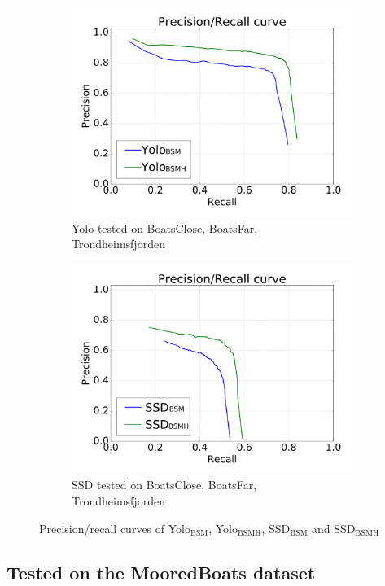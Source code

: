 \begin{figure}[h!]
\begin{subfigure}{.5\textwidth}
  \centering
  \includegraphics[width=0.8\linewidth]{results/case_buildings/prec_recall/yolo/bcbftrf-eps.png}
  \caption{Yolo tested on BoatsClose, BoatsFar, Trondheimsfjorden}
  \label{fig:sfig1}
\end{subfigure}%
\begin{subfigure}{.5\textwidth}
  \centering
  \includegraphics[width=.8\linewidth]{results/case_buildings/prec_recall/ssd/bcbftrf-eps.png}
  \caption{SSD tested on BoatsClose, BoatsFar, Trondheimsfjorden}
  \label{fig:sfig2}
\end{subfigure}
\caption{Precision/recall curves of Yolo$_{\text{BSM}}$, Yolo$_{\text{BSMH}}$, SSD$_{\text{BSM}}$ and SSD$_{\text{BSMH}}$}
\label{fig:case_build}
\end{figure}

\newpage


\subsection{Tested on the MooredBoats dataset}

